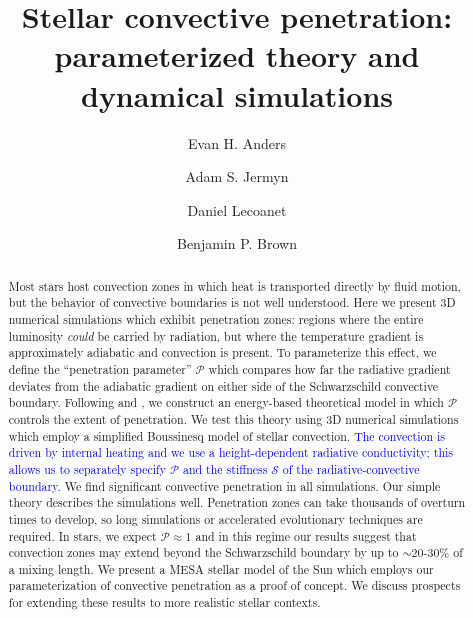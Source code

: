 \documentclass[twocolumn, linenumbers]{aastex631}
\newcommand{\mP}{\ensuremath{\mathcal{P}}}
\newcommand{\mS}{\ensuremath{\mathcal{S}}}
\newcommand{\editone}[1]{#1}
\newcommand{\edittwo}[1]{\textcolor{blue}{#1}}
\begin{document}
\title{\editone{Stellar convective penetration: parameterized theory and dynamical simulations}}
\author[0000-0002-3433-4733]{Evan H. Anders}
\author[0000-0001-5048-9973]{Adam S. Jermyn}
\author[0000-0002-7635-9728]{Daniel Lecoanet}
\author[0000-0001-8935-219X]{Benjamin P. Brown}


\begin{abstract}
Most stars host convection zones in which heat is transported directly by fluid motion, but the behavior of convective boundaries is not well understood.
Here we present 3D numerical simulations which exhibit penetration zones: regions where the entire luminosity \emph{could} be carried by radiation, but where the temperature gradient is approximately adiabatic and convection is present.
To parameterize this effect, we define the ``penetration parameter'' $\mP$ which compares how far the radiative gradient deviates from the adiabatic gradient on either side of the Schwarzschild convective boundary.
Following \citet{roxburgh1989} and \citet{zahn1991}, we construct an energy-based theoretical model in which $\mP$ controls the extent of penetration.
We test this theory using 3D numerical simulations which employ a simplified Boussinesq model of stellar convection.
\edittwo{
    The convection is driven by internal heating and we use a height-dependent radiative conductivity; this allows us to separately specify $\mP$ and the stiffness $\mS$ of the radiative-convective boundary.
}We find significant convective penetration in all simulations.
Our simple theory describes the simulations well.
Penetration zones can take thousands of overturn times to develop, so long simulations or accelerated evolutionary techniques are required.
In stars, we expect $\mathcal{P} \approx 1$ and in this regime our results suggest that convection zones may extend beyond the Schwarzschild boundary by up to $\sim$20-30\% of a mixing length.
We present a MESA stellar model of the Sun which employs our parameterization of convective penetration as a proof of concept.
We discuss prospects for extending these results to more realistic stellar contexts.
\end{abstract}
\end{document}
